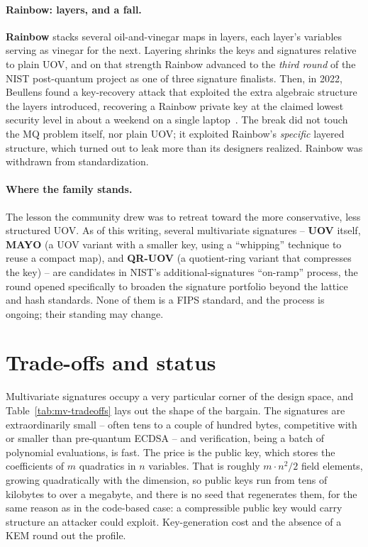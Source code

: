 \paragraph{Rainbow: layers, and a fall.}
\textbf{Rainbow} stacks several oil-and-vinegar maps in layers, each layer's variables serving as vinegar for the next. Layering shrinks the keys and signatures relative to plain UOV, and on that strength Rainbow advanced to the \emph{third round} of the NIST post-quantum project as one of three signature finalists. Then, in 2022, Beullens found a key-recovery attack that exploited the extra algebraic structure the layers introduced, recovering a Rainbow private key at the claimed lowest security level in about a weekend on a single laptop~\cite{beullens2022}. The break did not touch the MQ problem itself, nor plain UOV; it exploited Rainbow's \emph{specific} layered structure, which turned out to leak more than its designers realized. Rainbow was withdrawn from standardization.

\paragraph{Where the family stands.}
The lesson the community drew was to retreat toward the more conservative, less structured UOV. As of this writing, several multivariate signatures -- \textbf{UOV} itself, \textbf{MAYO} (a UOV variant with a smaller key, using a ``whipping'' technique to reuse a compact map), and \textbf{QR-UOV} (a quotient-ring variant that compresses the key) -- are candidates in NIST's additional-signatures ``on-ramp'' process, the round opened specifically to broaden the signature portfolio beyond the lattice and hash standards. None of them is a FIPS standard, and the process is ongoing; their standing may change.

\section{Trade-offs and status}

Multivariate signatures occupy a very particular corner of the design space, and Table~\ref{tab:mv-tradeoffs} lays out the shape of the bargain. The signatures are extraordinarily small -- often tens to a couple of hundred bytes, competitive with or smaller than pre-quantum ECDSA -- and verification, being a batch of polynomial evaluations, is fast. The price is the public key, which stores the coefficients of $m$ quadratics in $n$ variables. That is roughly $m \cdot n^2 / 2$ field elements, growing quadratically with the dimension, so public keys run from tens of kilobytes to over a megabyte, and there is no seed that regenerates them, for the same reason as in the code-based case: a compressible public key would carry structure an attacker could exploit. Key-generation cost and the absence of a KEM round out the profile.

